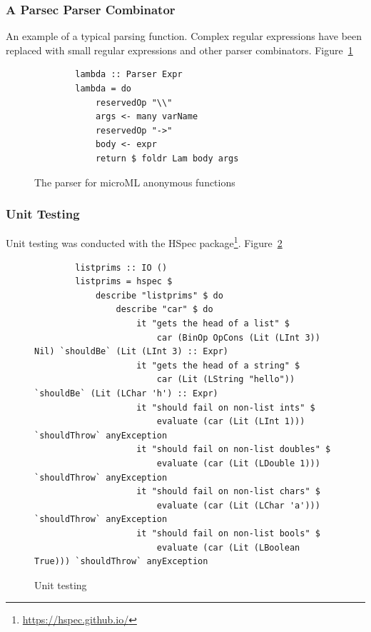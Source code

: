 \subsubsection{A Parsec Parser Combinator}
An example of a typical parsing function. Complex regular expressions have been replaced with small
regular expressions and other parser combinators. Figure~\ref{fig:parsec}

\begin{figure}
    \begin{verbatim}
        lambda :: Parser Expr
        lambda = do
            reservedOp "\\"
            args <- many varName
            reservedOp "->"
            body <- expr
            return $ foldr Lam body args
    \end{verbatim}
    \caption{The parser for microML anonymous functions}
\label{fig:parsec}
\end{figure}

\subsubsection{Unit Testing}
Unit testing was conducted with the HSpec package\footnote{\url{https://hspec.github.io/}}.
Figure~\ref{fig:unit}

\begin{figure}
    \begin{verbatim}
        listprims :: IO ()
        listprims = hspec $ 
            describe "listprims" $ do
                describe "car" $ do
                    it "gets the head of a list" $ 
                        car (BinOp OpCons (Lit (LInt 3)) Nil) `shouldBe` (Lit (LInt 3) :: Expr)
                    it "gets the head of a string" $
                        car (Lit (LString "hello")) `shouldBe` (Lit (LChar 'h') :: Expr)
                    it "should fail on non-list ints" $ 
                        evaluate (car (Lit (LInt 1)))        `shouldThrow` anyException
                    it "should fail on non-list doubles" $ 
                        evaluate (car (Lit (LDouble 1)))     `shouldThrow` anyException
                    it "should fail on non-list chars" $ 
                        evaluate (car (Lit (LChar 'a')))     `shouldThrow` anyException
                    it "should fail on non-list bools" $ 
                        evaluate (car (Lit (LBoolean True))) `shouldThrow` anyException
    \end{verbatim}
    \caption{Unit testing}
\label{fig:unit}
\end{figure}



